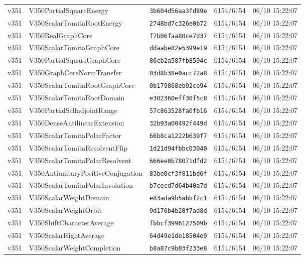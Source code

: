\documentclass[11pt]{article}
\theoremstyle{definition}\newtheorem{deriv}{Derivação}
\begin{document}
{\begin{longtable}{@{}lllll@{}}
v351 & V350PartialSquareEnergy & \texttt{3b604d56aa3fd89e} & 6154/6154 & 06/10 15:22:07 \\
v351 & V350ScalarTomitaRootEnergy & \texttt{2748bd7c326e0b72} & 6154/6154 & 06/10 15:22:07 \\
v351 & V350RealGraphCore & \texttt{f7b06faa80ce7d37} & 6154/6154 & 06/10 15:22:07 \\
v351 & V350ScalarTomitaGraphCore & \texttt{ddaabe82e5399e19} & 6154/6154 & 06/10 15:22:07 \\
v351 & V350PartialSquareGraphCore & \texttt{86cb2a587fb8594c} & 6154/6154 & 06/10 15:22:07 \\
v351 & V350GraphCoreNormTransfer & \texttt{03d8b38e0acc72a8} & 6154/6154 & 06/10 15:22:07 \\
v351 & V350ScalarTomitaRootGraphCore & \texttt{0b179868eb92ce94} & 6154/6154 & 06/10 15:22:07 \\
v351 & V350ScalarTomitaRootDomain & \texttt{e302360eff30f5c8} & 6154/6154 & 06/10 15:22:07 \\
v351 & V350PartialSelfadjointRange & \texttt{57c863528fa0fb16} & 6154/6154 & 06/10 15:22:07 \\
v351 & V350DenseAntilinearExtension & \texttt{32b93a00492f449d} & 6154/6154 & 06/10 15:22:07 \\
v351 & V350ScalarTomitaPolarFactor & \texttt{66b8ca1222b639f7} & 6154/6154 & 06/10 15:22:07 \\
v351 & V350ScalarTomitaResolventFlip & \texttt{1d21d94fbbc03040} & 6154/6154 & 06/10 15:22:07 \\
v351 & V350ScalarTomitaPolarResolvent & \texttt{666ee0b78071dfd2} & 6154/6154 & 06/10 15:22:07 \\
v351 & V350AntiunitaryPositiveConjugation & \texttt{83be0cf3f811bd6f} & 6154/6154 & 06/10 15:22:07 \\
v351 & V350ScalarTomitaPolarInvolution & \texttt{b7cecd7d64b40a7d} & 6154/6154 & 06/10 15:22:07 \\
v351 & V350ScalarWeightDomain & \texttt{e83ada9b5abbf2c1} & 6154/6154 & 06/10 15:22:07 \\
v351 & V350ScalarWeightOrbit & \texttt{9d170b4b28f7ad8d} & 6154/6154 & 06/10 15:22:07 \\
v351 & V350ShiftCharacterAverage & \texttt{fbbcf3996127509b} & 6154/6154 & 06/10 15:22:07 \\
v351 & V350ScalarRightAverage & \texttt{64d49e1de18504e9} & 6154/6154 & 06/10 15:22:07 \\
v351 & V350ScalarWeightCompletion & \texttt{b8a87c9b03f233e8} & 6154/6154 & 06/10 15:22:07 \\

\end{longtable}}
\end{document}
